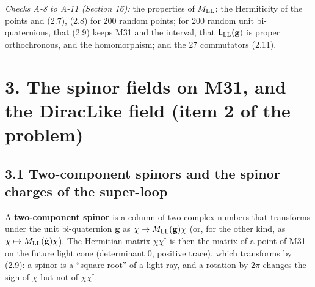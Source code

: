 \documentclass[
  10pt,
]{article}
\begin{document}
\emph{Checks A-8 to A-11 (Section 16):} the properties of
\(M_{\rm LL}\); the Hermiticity of the points and (2.7), (2.8) for 200
random points; for 200 random unit bi-quaternions, that (2.9) keeps M31
and the interval, that \(\mathsf L_{\rm LL}(\mathbf g)\) is proper
orthochronous, and the homomorphism; and the 27 commutators (2.11).

\hypertarget{the-spinor-fields-on-m31-and-the-diraclike-field-item-2-of-the-problem}{%
\section{3. The spinor fields on M31, and the DiracLike field (item 2 of
the
problem)}\label{the-spinor-fields-on-m31-and-the-diraclike-field-item-2-of-the-problem}}

\hypertarget{two-component-spinors-and-the-spinor-charges-of-the-super-loop}{%
\subsection{3.1 Two-component spinors and the spinor charges of the
super-loop}\label{two-component-spinors-and-the-spinor-charges-of-the-super-loop}}

A \textbf{two-component spinor} is a column of two complex numbers that
transforms under the unit bi-quaternion \(\mathbf g\) as
\(\chi\mapsto M_{\rm LL}(\mathbf g)\chi\) (or, for the other kind, as
\(\chi\mapsto M_{\rm LL}(\tilde{\mathbf g})\chi\)). The Hermitian matrix
\(\chi\chi^\dagger\) is then the matrix of a point of M31 on the future
light cone (determinant 0, positive trace), which transforms by (2.9): a
spinor is a ``square root'' of a light ray, and a rotation by \(2\pi\)
changes the sign of \(\chi\) but not of \(\chi\chi^\dagger\).
\end{document}
